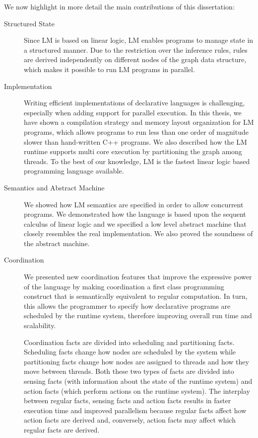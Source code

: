 We now highlight in more detail the main contributions of this dissertation:

\begin{description}
   \item[Structured State]

Since LM is based on linear logic, LM enables programs to manage state in a
structured manner. Due to the restriction over the inference rules, rules are
derived independently on different nodes of the graph data structure, which
makes it possible to run LM programs in parallel.

   \item[Implementation]

Writing efficient implementations of declarative languages is challenging,
especially when adding support for parallel execution. In this thesis, we have
shown a compilation strategy and memory layout organization for LM programs,
which allows programs to run less than one order of magnitude slower than
hand-written C++ programs. We also described how the LM runtime supports
multi core execution by partitioning the graph among threads. To the best of our
knowledge, LM is the fastest linear logic based programming language available.

\item[Semantics and Abstract Machine]

We showed how LM semantics are specified in order to allow concurrent
programs. We demonstrated how the language is based upon the sequent calculus of
linear logic and we specified a low level abstract machine that closely
resembles the real implementation. We also proved the soundness of the
abstract machine.

\item[Coordination]

We presented new coordination features that improve the expressive
power of the language by making coordination a first class programming construct
that is semantically equivalent to regular computation. In turn, this allows the
programmer to specify how declarative programs are scheduled by the runtime
system, therefore improving overall run time and scalability.

Coordination facts are divided into scheduling and partitioning facts.
Scheduling facts change how nodes are scheduled by the system while partitioning
facts change how nodes are assigned to threads and how they move between
threads. Both these two types of facts are divided into sensing facts (with
information about the state of the runtime system) and action facts (which
perform actions on the runtime system). The interplay between regular facts,
sensing facts and action facts results in faster execution time and improved
parallelism because regular facts affect how action facts are derived and,
conversely, action facts may affect which regular facts are derived.


\end{description}
